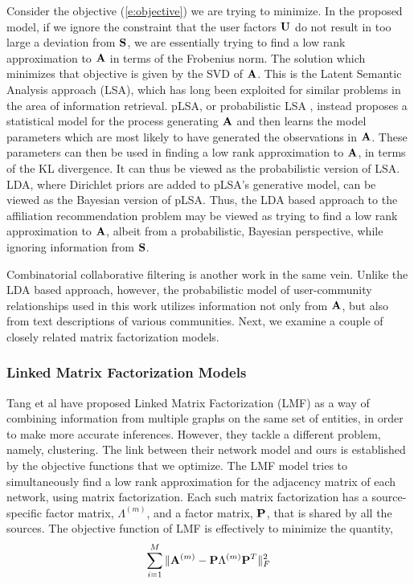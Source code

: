 \documentclass{sig-alternate}
\begin{document}
Consider the objective (\ref{e:objective}) we are trying to minimize. In the proposed model, if we ignore the constraint that the user factors $\mathbf{U}$ do not result in too large a deviation from $\mathbf{S}$, we are essentially trying to find a low rank approximation to $\mathbf{A}$ in terms of the Frobenius norm. The solution which minimizes that objective is given by the SVD of $\mathbf{A}$. This is the Latent Semantic Analysis approach (LSA), which has long been exploited for similar problems in the area of information retrieval. pLSA, or probabilistic LSA \cite{HofmannPLSI}, instead proposes a statistical model for the process generating $\mathbf{A}$ and then learns the model parameters which are most likely to have generated the observations in $\mathbf{A}$. These parameters can then be used in finding a low rank approximation to $\mathbf{A}$, in terms of the KL divergence. It can thus be viewed as the probabilistic version of LSA. LDA, where Dirichlet priors are added to pLSA's generative model, can be viewed as the Bayesian version of pLSA. Thus, the LDA based approach to the affiliation recommendation problem may be viewed as trying to find a low rank approximation to $\mathbf{A}$, albeit from a probabilistic, Bayesian perspective, while ignoring information from $\mathbf{S}$.

Combinatorial collaborative filtering\cite{GoogleCCF} is another work in the same vein. Unlike the LDA based approach, however, the probabilistic model of user-community relationships used in this work utilizes information not only from $\mathbf{A}$, but also from text descriptions of various communities. Next, we examine a couple of closely related matrix factorization models.

\subsubsection{Linked Matrix Factorization Models}
Tang et al have proposed Linked Matrix Factorization (LMF) \cite{WeiLMF} as a way of combining information from multiple graphs on the same set of entities, in order to make more accurate inferences. However, they tackle a different problem, namely, clustering. The link between their network model and ours is established by the objective functions that we optimize. The LMF model tries to simultaneously find a low rank approximation for the adjacency matrix of each network, using matrix factorization. Each such matrix factorization has a source-specific factor matrix, $\Lambda^{(m)}$, and a factor matrix, $\mathbf{P}$, that is shared by all the sources. The objective function of LMF is effectively to minimize the quantity,
\begin{equation*}
\displaystyle\sum_{i=1}^{M}\|\mathbf{A}^{(m)} - \mathbf{P} \Lambda^{(m)} \mathbf{P}^T\|_{F}^2
\label{e:LMF}
\end{equation*}
\end{document}
